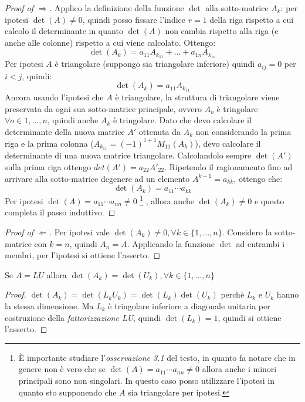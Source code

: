 \begin{proof}[Proof of $\Rightarrow$]
Applico la definizione della funzione $\det$ alla sotto-matrice $A_{k}$: per
ipotesi $\det(A) \not = 0$, quindi posso fissare l'indice $r = 1$ della riga
rispetto a cui calcolo il determinante in quanto $\det(A)$ non cambia rispetto
alla riga (e anche alle colonne) rispetto a cui viene calcolato. Ottengo:
\begin{displaymath}
\det(A_{k}) = a_{11}A_{k_{11}} + \ldots + a_{1n}A_{k_{1n}}
\end{displaymath}
Per ipotesi $A$ \`e triangolare (suppongo sia triangolare inferiore) quindi
$a_{ij} = 0$ per $i < j$, quindi:
\begin{displaymath}
\det(A_{k}) = a_{11}A_{k_{11}}
\end{displaymath}
Ancora usando l'ipotesi che $A$ \`e triangolare, la struttura di triangolare
viene preservata da ogni sua sotto-matrice principale, ovvero $A_{o}$ \`e
tringolare $\forall o \in {1,\ldots,n}$, quindi anche $A_{k}$ \`e tringolare.
Dato che devo calcolare il determinante della nuova matrice $A'$ ottenuta da 
$A_{k}$ non considerando la prima riga e la prima colonna ($A_{k_{11}} =
(-1)^{1+1}M_{11}(A_{k})$), devo calcolare il determinante di una nuova matrice 
triangolare. Calcolandolo sempre $\det(A')$ sulla prima riga
ottengo $det(A') = a_{22}A'_{22}$. Ripetendo il ragionamento fino ad arrivare
alla sotto-matrice degenere ad un elemento $A^{k-1} = a_{kk}$, ottengo che: 
\begin{displaymath}
\det(A_{k}) = a_{11}\cdots a_{kk}
\end{displaymath}
Per ipotesi $\det(A) = a_{11} \cdots a_{nn} \not = 0$ \footnote{\`E importante
studiare l'\emph{osservazione 3.1} del testo, in quanto fa notare che in genere
non \`e vero che se $\det(A) = a_{11} \cdots a_{nn} \not = 0$ allora anche i
minori principali sono non singolari. In questo caso posso utilizzare l'ipotesi
in quanto sto supponendo che $A$ sia triangolare per ipotesi.} , allora anche
$\det(A_{k}) \not = 0$ e questo completa il passo induttivo.
\end{proof}

\begin{proof}[Proof of $\Leftarrow$]
Per ipotesi vale $\det(A_{k}) \not = 0, \forall k \in \lbrace 1, \ldots,
n\rbrace$. Considero la sotto-matrice con $k = n$, quindi $A_{n} = A$.
Applicando la funzione $\det$ ad entrambi i membri, per l'ipotesi si
ottiene l'asserto.
\end{proof}



\begin{exercise}[3.5, Lemma 3.3]
Se $A = LU$ allora 
$\det(A_{k}) = \det(U_{k}), \forall k \in \lbrace 1,\ldots,n \rbrace$
\end{exercise}
\begin{proof}
$\det(A_{k}) = \det(L_{k}U_{k}) = \det(L_{k}) \det(U_{k})$ perch\`e $L_{k}$ e
$U_{k}$ hanno la stessa dimensione. Ma $L_{k}$ \`e tringolare inferiore a
diagonale unitaria per costruzione della \emph{fattorizzazione LU}, quindi
$\det(L_{k}) = 1$, quindi si ottiene l'asserto.
\end{proof}